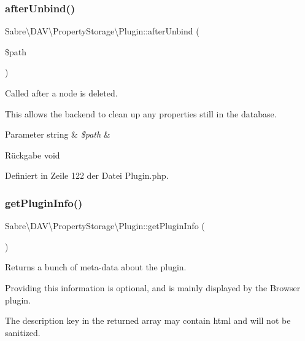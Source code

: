 \subsubsection{\texorpdfstring{after\+Unbind()}{afterUnbind()}}
{\footnotesize\ttfamily Sabre\textbackslash{}\+D\+A\+V\textbackslash{}\+Property\+Storage\textbackslash{}\+Plugin\+::after\+Unbind (\begin{DoxyParamCaption}\item[{}]{\$path }\end{DoxyParamCaption})}

Called after a node is deleted.

This allows the backend to clean up any properties still in the database.


\begin{DoxyParams}[1]{Parameter}
string & {\em \$path} & \\
\hline
\end{DoxyParams}
\begin{DoxyReturn}{Rückgabe}
void 
\end{DoxyReturn}


Definiert in Zeile 122 der Datei Plugin.\+php.

\mbox{\label{class_sabre_1_1_d_a_v_1_1_property_storage_1_1_plugin_a548b734bf353d12140ce234efaf92bc5}} 
\subsubsection{\texorpdfstring{get\+Plugin\+Info()}{getPluginInfo()}}
{\footnotesize\ttfamily Sabre\textbackslash{}\+D\+A\+V\textbackslash{}\+Property\+Storage\textbackslash{}\+Plugin\+::get\+Plugin\+Info (\begin{DoxyParamCaption}{ }\end{DoxyParamCaption})}

Returns a bunch of meta-\/data about the plugin.

Providing this information is optional, and is mainly displayed by the Browser plugin.

The description key in the returned array may contain html and will not be sanitized.

